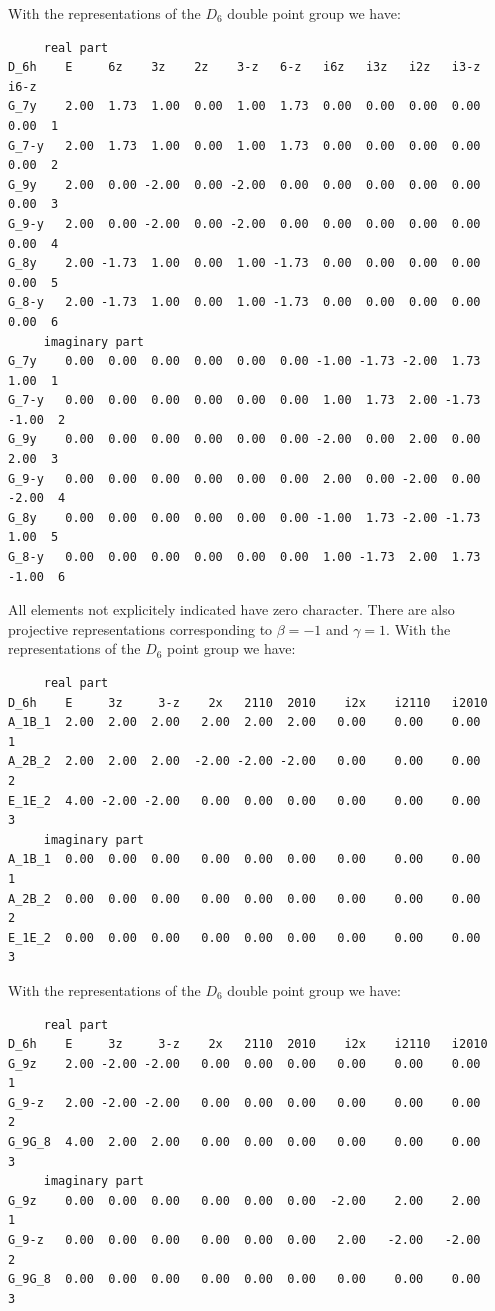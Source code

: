\documentclass[12pt,a4paper]{article}
\begin{document}
With the representations of the $D_6$ double point group we have:
\begin{verbatim}
     real part
D_6h    E     6z    3z    2z    3-z   6-z   i6z   i3z   i2z   i3-z   i6-z
G_7y    2.00  1.73  1.00  0.00  1.00  1.73  0.00  0.00  0.00  0.00   0.00  1
G_7-y   2.00  1.73  1.00  0.00  1.00  1.73  0.00  0.00  0.00  0.00   0.00  2
G_9y    2.00  0.00 -2.00  0.00 -2.00  0.00  0.00  0.00  0.00  0.00   0.00  3
G_9-y   2.00  0.00 -2.00  0.00 -2.00  0.00  0.00  0.00  0.00  0.00   0.00  4
G_8y    2.00 -1.73  1.00  0.00  1.00 -1.73  0.00  0.00  0.00  0.00   0.00  5
G_8-y   2.00 -1.73  1.00  0.00  1.00 -1.73  0.00  0.00  0.00  0.00   0.00  6
     imaginary part
G_7y    0.00  0.00  0.00  0.00  0.00  0.00 -1.00 -1.73 -2.00  1.73   1.00  1
G_7-y   0.00  0.00  0.00  0.00  0.00  0.00  1.00  1.73  2.00 -1.73  -1.00  2
G_9y    0.00  0.00  0.00  0.00  0.00  0.00 -2.00  0.00  2.00  0.00   2.00  3
G_9-y   0.00  0.00  0.00  0.00  0.00  0.00  2.00  0.00 -2.00  0.00  -2.00  4
G_8y    0.00  0.00  0.00  0.00  0.00  0.00 -1.00  1.73 -2.00 -1.73   1.00  5
G_8-y   0.00  0.00  0.00  0.00  0.00  0.00  1.00 -1.73  2.00  1.73  -1.00  6
\end{verbatim}
All elements not explicitely indicated have zero character.
There are also projective representations corresponding to $\beta=-1$ 
and $\gamma=1$. With the representations of the $D_6$ point group we have:  
\begin{verbatim}
     real part
D_6h    E     3z     3-z    2x   2110  2010    i2x    i2110   i2010
A_1B_1  2.00  2.00  2.00   2.00  2.00  2.00   0.00    0.00    0.00     1
A_2B_2  2.00  2.00  2.00  -2.00 -2.00 -2.00   0.00    0.00    0.00     2
E_1E_2  4.00 -2.00 -2.00   0.00  0.00  0.00   0.00    0.00    0.00     3
     imaginary part
A_1B_1  0.00  0.00  0.00   0.00  0.00  0.00   0.00    0.00    0.00     1
A_2B_2  0.00  0.00  0.00   0.00  0.00  0.00   0.00    0.00    0.00     2
E_1E_2  0.00  0.00  0.00   0.00  0.00  0.00   0.00    0.00    0.00     3
\end{verbatim}
With the representations of the $D_6$ double point group we have:
\begin{verbatim}
     real part
D_6h    E     3z     3-z    2x   2110  2010    i2x    i2110   i2010
G_9z    2.00 -2.00 -2.00   0.00  0.00  0.00   0.00    0.00    0.00     1
G_9-z   2.00 -2.00 -2.00   0.00  0.00  0.00   0.00    0.00    0.00     2
G_9G_8  4.00  2.00  2.00   0.00  0.00  0.00   0.00    0.00    0.00     3
     imaginary part
G_9z    0.00  0.00  0.00   0.00  0.00  0.00  -2.00    2.00    2.00     1
G_9-z   0.00  0.00  0.00   0.00  0.00  0.00   2.00   -2.00   -2.00     2
G_9G_8  0.00  0.00  0.00   0.00  0.00  0.00   0.00    0.00    0.00     3
\end{verbatim}
\end{document}
